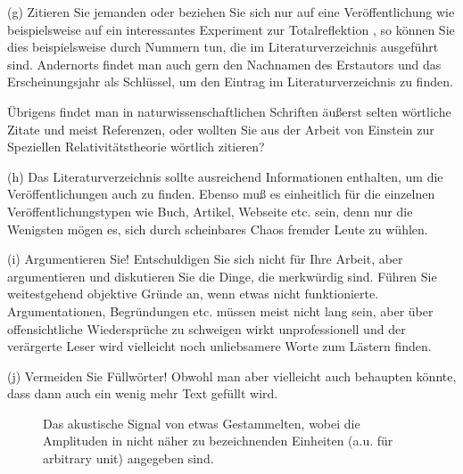 \begin{list}{-}{}
\item[(g)] Zitieren Sie jemanden oder beziehen Sie sich nur auf eine
Veröffentlichung wie beispielsweise auf ein interessantes Experiment 
zur Totalreflektion \cite{Goos1947}, so können Sie dies beispielsweise 
durch Nummern tun, die im Literaturverzeichnis ausgeführt sind.
Andernorts findet man auch gern den Nachnamen des Erstautors und
das Erscheinungsjahr als Schlüssel, um den Eintrag im Literaturverzeichnis
zu finden. 

Übrigens findet man in naturwissenschaftlichen Schriften 
äußerst selten wörtliche Zitate und meist Referenzen, oder wollten Sie
aus der Arbeit von Einstein zur Speziellen Relativitätstheorie \cite{Einstein1905}
wörtlich zitieren?

\item[(h)] Das Literaturverzeichnis sollte ausreichend Informationen enthalten,
um die Veröffentlichungen auch zu finden. Ebenso muß es einheitlich für
die einzelnen Veröffentlichungstypen wie Buch, Artikel, Webseite etc. sein,
denn nur die Wenigsten mögen es, sich durch scheinbares Chaos fremder Leute zu wühlen.

\item[(i)] Argumentieren Sie! Entschuldigen Sie sich nicht für Ihre Arbeit, 
aber argumentieren und diskutieren Sie die Dinge, die merkwürdig sind.
Führen Sie weitestgehend objektive Gründe an, wenn etwas nicht funktionierte.
Argumentationen, Begründungen etc. müssen meist nicht lang sein, 
aber über offensichtliche Wiedersprüche zu schweigen wirkt unprofessionell 
und der verärgerte Leser wird vielleicht noch unliebsamere Worte 
zum Lästern finden.

\item[(j)] Vermeiden Sie Füllwörter! Obwohl man aber vielleicht auch behaupten
könnte, dass dann auch ein wenig mehr Text gefüllt wird.
\end{list}

\begin{figure}[t]
\centering
\caption{Das akustische Signal von etwas Gestammelten, wobei die Amplituden in 
nicht näher zu bezeichnenden Einheiten (a.u. für arbitrary unit) angegeben sind.}
\label{fig:audio}
\end{figure}
